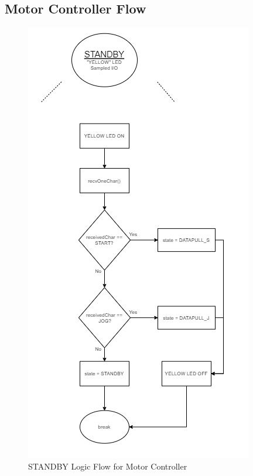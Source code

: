 \documentclass[journal]{IEEEtran}
\begin{document}
        \newpage
        \quad
        \newpage
        
    \subsection{Motor Controller Flow}
        \begin{figure}[H]
            \centering
            \includegraphics[scale = 1]{Images/STANDBY_ver1.jpg}
            \caption{STANDBY Logic Flow for Motor Controller}
            \label{fig:STANDBY_mc}
        \end{figure}
        
        \newpage
        \quad
        \newpage
        
\end{document}
